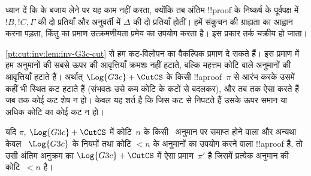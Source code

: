\documentclass[../../../include/open-logic-section]{subfiles}
\begin{document}
ध्यान दें कि \CutCS के बजाय \Cut{} लेने पर यह काम नहीं करता, क्योंकि तब अंतिम
!!{proof} के निष्कर्ष के पूर्वपक्ष में $!B, !C, \Gamma$ की दो प्रतियाँ और
अनुवर्ती में $\Delta$ की दो प्रतियाँ होतीं। हमें संकुचन की ग्राह्यता का आह्वान
करना पड़ता, किंतु  का प्रमाण उत्क्रमणीयता
प्रमेय का उपयोग करता है। इस प्रकार तर्क चक्रीय हो जाता।

\cref{pt:cut:inv:lem:inv-G3c-cut} से हम कट-विलोपन का वैकल्पिक प्रमाण दे सकते
हैं। इस प्रमाण में हम \CutCS{} अनुमानों की सबसे ऊपर की आवृत्तियाँ क्रमशः नहीं
हटाते, बल्कि महत्तम कोटि वाले \CutCS{} अनुमानों की आवृत्तियाँ हटाते हैं।
अर्थात् $\Log{G3c} + \CutCS$ के किसी !!a{proof}~$\pi$ से आरंभ करके उसमें कहीं
भी स्थित कट हटाते हैं (संभवतः उसे कम कोटि के कटों से बदलकर), और तब तक ऐसा करते
हैं जब तक कोई कट शेष न हो। केवल यह शर्त है कि जिस कट से निपटते हैं उसके ऊपर
समान या अधिक कोटि का कोई कट न हो।

\begin{lem} यदि $\pi$, $\Log{G3c}+\CutCS$ में
कोटि~$n$ के किसी~\CutCS{} अनुमान पर समाप्त होने वाला और अन्यथा केवल
~$\Log{G3c}$ के नियमों तथा कोटि $<n$ के \CutCS{} अनुमानों का उपयोग करने वाला
!!a{proof} है, तो उसी अंतिम अनुक्रम का $\Log{G3c} + \CutCS$ में ऐसा
प्रमाण~$\pi'$ है जिसमें प्रत्येक \CutCS{} अनुमान की कोटि~$<n$ है।
\end{lem}
\end{document}
